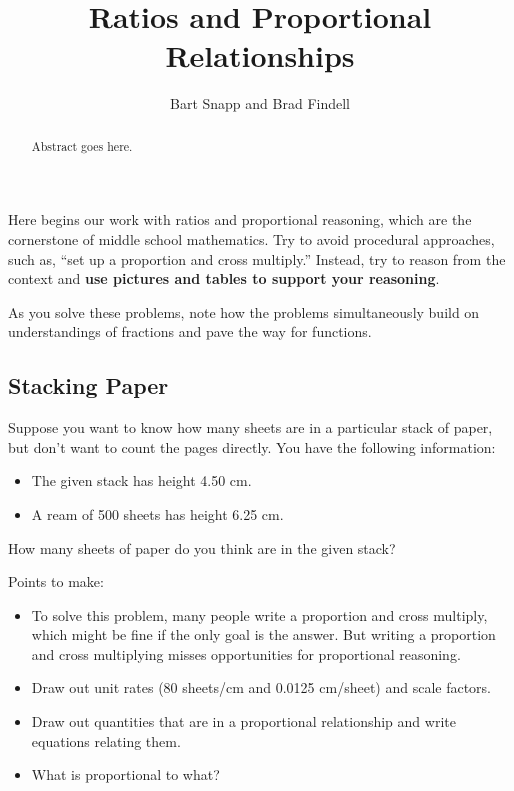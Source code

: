 \documentclass{ximera}
\title{Ratios and Proportional Relationships}
\author{Bart Snapp and Brad Findell}
\begin{document}
\begin{abstract}
Abstract goes here.  
\end{abstract}
\maketitle

\label{A:ratioLaunch}
Here begins our work with ratios and proportional reasoning, which are the cornerstone of middle school mathematics.  Try to avoid procedural approaches, such as, ``set up a proportion and cross multiply.''  Instead, try to reason from the context and \textbf{use pictures and tables to support your reasoning}.  

As you solve these problems, note how the problems simultaneously build on understandings of fractions and pave the way for functions.  


\subsection*{Stacking Paper}
\begin{problem}
Suppose you want to know how many sheets are in a particular stack of paper, but don't want to count the pages directly. You have the following information:
\begin{itemize}
\item The given stack has height 4.50 cm.
\item A ream of 500 sheets has height 6.25 cm.
\end{itemize}
How many sheets of paper do you think are in the given stack?
\end{problem}


\begin{teachingnote}
Points to make: 
\begin{itemize}
\item To solve this problem, many people write a proportion and cross multiply, which might be fine if the only goal is the answer.  
But writing a proportion and cross multiplying misses opportunities for proportional reasoning.  
\item Draw out unit rates (80 sheets/cm and 0.0125 cm/sheet) and scale factors.  
\item Draw out quantities that are in a proportional relationship and write equations relating them.  
\item What is proportional to what?  
\end{itemize}
\end{teachingnote}
\end{document}
